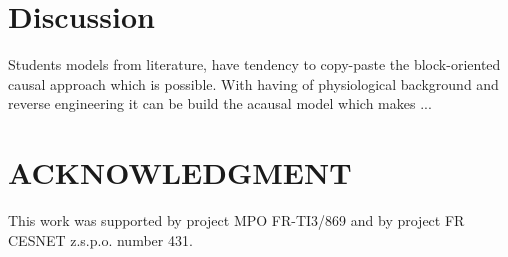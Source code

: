 \documentclass[letterpaper, 10 pt, conference]{ieeeconf}  %
\begin{document}







\section{Discussion}

Students models from literature, have tendency to copy-paste the block-oriented causal approach  which is possible.
With having of physiological background and reverse engineering it can be build the acausal model which makes ...


\section*{ACKNOWLEDGMENT}
This work was supported by project MPO FR-TI3/869 and by project FR CESNET z.s.p.o. number 431.



\end{document}
